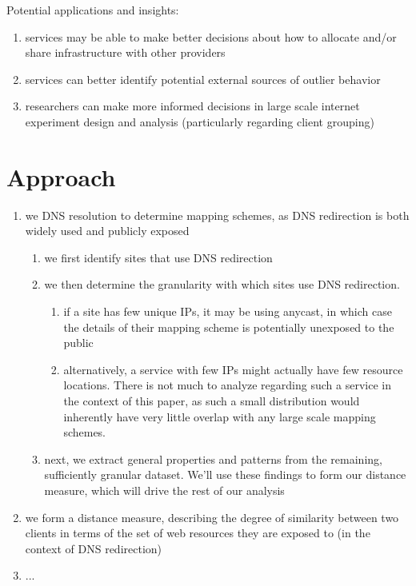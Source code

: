 \documentclass[10pt, sigconf]{acmart}
\begin{document}
Potential applications and insights:
\begin{enumerate}
    \item services may be able to make better decisions about how to allocate
        and/or share infrastructure with other providers
    \item services can better identify potential external sources of outlier behavior
    \item researchers can make more informed decisions in large scale internet
        experiment design and analysis (particularly regarding client grouping)
\end{enumerate}

\section{Approach}
\begin{enumerate}
    \item we DNS resolution to determine mapping schemes, as DNS redirection is
        both widely used and publicly exposed
        \begin{enumerate}
            \item we first identify sites that use DNS redirection 
            \item we then determine the granularity with which sites use DNS
                redirection.
                \begin{enumerate}
                    \item if a site has few unique IPs, it may be using anycast,
                        in which case the details of their mapping scheme is
                        potentially unexposed to the public 
                    \item alternatively, a service with few IPs might actually
                        have few resource locations. There
                        is not much to analyze regarding such a service in the
                        context of this paper, as such a small distribution
                        would inherently have very little overlap with any
                        large scale mapping schemes.
                \end{enumerate}
            \item next, we extract general properties and patterns from the
                remaining, sufficiently granular dataset. We'll use these
                findings to form our distance measure, which will drive the rest
                of our analysis
        \end{enumerate}
    \item we form a distance measure, describing the degree of similarity
        between two clients in terms of the set of web resources they are
        exposed to (in the context of DNS redirection)
    \item ...
\end{enumerate}

\clearpage


 
\end{document}
